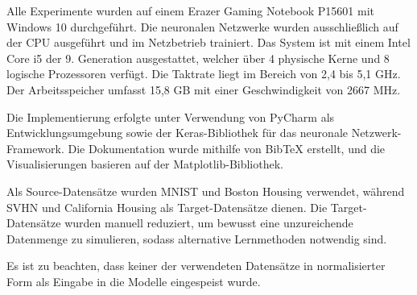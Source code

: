 Alle Experimente wurden auf einem Erazer Gaming Notebook P15601 mit Windows 10 durchgeführt. Die neuronalen Netzwerke wurden ausschließlich auf 
der CPU ausgeführt und im Netzbetrieb trainiert. Das System ist mit einem Intel Core i5 der 9. Generation ausgestattet, welcher 
über 4 physische Kerne und 8 logische Prozessoren verfügt. Die Taktrate liegt im Bereich von 2,4 bis 5,1 GHz. Der Arbeitsspeicher umfasst 15,8 GB 
mit einer Geschwindigkeit von 2667 MHz.

Die Implementierung erfolgte unter Verwendung von PyCharm als Entwicklungsumgebung sowie der Keras-Bibliothek für das neuronale 
Netzwerk-Framework. Die Dokumentation wurde mithilfe von BibTeX erstellt, und die Visualisierungen basieren auf der Matplotlib-Bibliothek.

Als Source-Datensätze wurden MNIST und Boston Housing verwendet, während SVHN und California Housing als Target-Datensätze 
dienen. Die Target-Datensätze wurden manuell reduziert, um bewusst eine unzureichende Datenmenge zu simulieren, sodass alternative 
Lernmethoden notwendig sind.

Es ist zu beachten, dass keiner der verwendeten Datensätze in normalisierter Form als Eingabe in die Modelle eingespeist wurde.
